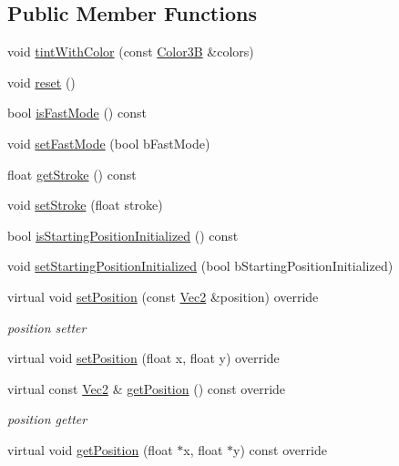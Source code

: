 \subsection*{Public Member Functions}
\begin{DoxyCompactItemize}
\item 
void \hyperlink{classMotionStreak_afc5b74bffba734239d696a2f333c2734}{tint\+With\+Color} (const \hyperlink{structColor3B}{Color3B} \&colors)
\item 
void \hyperlink{classMotionStreak_accbce67250d3b95ee9bf6b81c5854d44}{reset} ()
\item 
bool \hyperlink{classMotionStreak_a6198d0182d9c932af19a7517419e76dc}{is\+Fast\+Mode} () const
\item 
void \hyperlink{classMotionStreak_ac05305e418ee7cf9573cb373b651140f}{set\+Fast\+Mode} (bool b\+Fast\+Mode)
\item 
float \hyperlink{classMotionStreak_adef21bada492d363a843ae275aceebdd}{get\+Stroke} () const
\item 
void \hyperlink{classMotionStreak_abba05cb77e5d622147577add730d15b9}{set\+Stroke} (float stroke)
\item 
bool \hyperlink{classMotionStreak_a68d95751d1dda2b0e293262bb49e54f5}{is\+Starting\+Position\+Initialized} () const
\item 
void \hyperlink{classMotionStreak_af5c5821339dbf85b0ec3277316a04198}{set\+Starting\+Position\+Initialized} (bool b\+Starting\+Position\+Initialized)
\item 
virtual void \hyperlink{classMotionStreak_a2d7df706b1ec462093363d18fd0baf58}{set\+Position} (const \hyperlink{classVec2}{Vec2} \&position) override
\begin{DoxyCompactList}\small\item\em position setter \end{DoxyCompactList}\item 
virtual void \hyperlink{classMotionStreak_a8799ee17a6842cad944b85d67f1155d0}{set\+Position} (float x, float y) override
\item 
virtual const \hyperlink{classVec2}{Vec2} \& \hyperlink{classMotionStreak_ae5dbfd01e4931044ac764dd43c6fbf30}{get\+Position} () const override
\begin{DoxyCompactList}\small\item\em position getter \end{DoxyCompactList}\item 
virtual void \hyperlink{classMotionStreak_a979de1d0159b7ebca8c4270aa8d1eece}{get\+Position} (float $\ast$x, float $\ast$y) const override

\end{DoxyCompactItemize}
